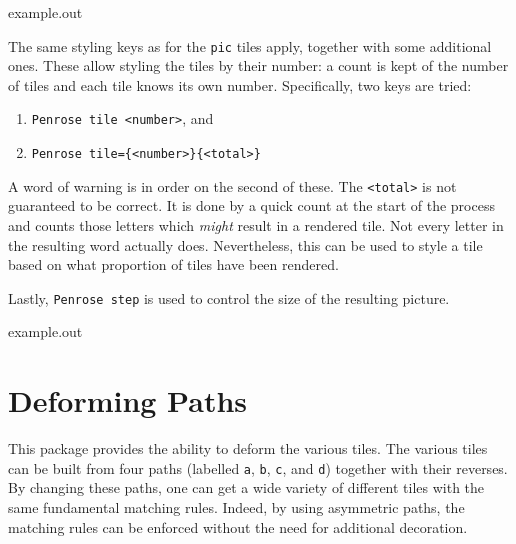 \documentclass{ltxdoc}
\newenvironment{example}
  {\VerbatimEnvironment
   \begin{VerbatimOut}{example.out}}
  {\end{VerbatimOut}
   \begin{center}
   \setlength{\parindent}{0pt}
   \fbox{\begin{minipage}{.9\linewidth}
     \lstset{breakatwhitespace=true,breaklines=true,language=TeX,basicstyle=\small}
     
   \end{minipage}}

   \fbox{\begin{minipage}{.9\linewidth}
     \centering
     
   \end{minipage}}
\end{center}
}
\begin{document}
\begin{example}
\end{example}

The same styling keys as for the \Verb+pic+ tiles apply, together with some additional ones.
These allow styling the tiles by their number: a count is kept of the number of tiles and each tile knows its own number.
Specifically, two keys are tried:
%
\begin{enumerate}
\item \Verb+Penrose tile <number>+, and
\item \Verb+Penrose tile={<number>}{<total>}+
\end{enumerate}
%
A word of warning is in order on the second of these.
The \Verb+<total>+ is not guaranteed to be correct.
It is done by a quick count at the start of the process and counts those letters which \emph{might} result in a rendered tile.
Not every letter in the resulting word actually does.
Nevertheless, this can be used to style a tile based on what proportion of tiles have been rendered.

Lastly, \Verb+Penrose step+ is used to control the size of the resulting picture.

\begin{example}
\end{example}

\section{Deforming Paths}
\label{sec:pathdeform}

This package provides the ability to deform the various tiles.
The various tiles can be built from four paths (labelled \Verb+a+, \Verb+b+, \Verb+c+, and \Verb+d+) together with their reverses.
By changing these paths, one can get a wide variety of different tiles with the same fundamental matching rules.
Indeed, by using asymmetric paths, the matching rules can be enforced without the need for additional decoration.
\end{document}
